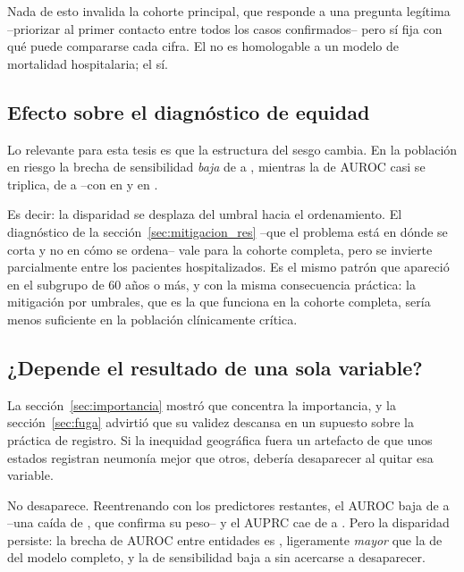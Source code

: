 Nada de esto invalida la cohorte principal, que responde a una pregunta legítima
--priorizar al primer contacto entre todos los casos confirmados-- pero sí fija
con qué puede compararse cada cifra. El \aurocGlobal{} no es homologable a un
modelo de mortalidad hospitalaria; el \hospAUROC{} sí.

\subsection{Efecto sobre el diagnóstico de equidad}

Lo relevante para esta tesis es que la estructura del sesgo cambia. En la
población en riesgo la brecha de sensibilidad \emph{baja} de \gapTPRentidad{} a
\hospGapTPR, mientras la de AUROC casi se triplica, de \gapAUROCentidad{} a
\hospGapAUROC{} --con \hospPeor{} en \hospPeorAUROC{} y \hospMejor{} en
\hospMejorAUROC.

Es decir: la disparidad se desplaza del umbral hacia el ordenamiento. El
diagnóstico de la sección~\ref{sec:mitigacion_res} --que el problema está en
dónde se corta y no en cómo se ordena-- vale para la cohorte completa, pero se
invierte parcialmente entre los pacientes hospitalizados. Es el mismo patrón que
apareció en el subgrupo de 60 años o más, y con la misma consecuencia práctica:
la mitigación por umbrales, que es la que funciona en la cohorte completa, sería
menos suficiente en la población clínicamente crítica.

\subsection{¿Depende el resultado de una sola variable?}

La sección~\ref{sec:importancia} mostró que \texttt{\impPrimeraVar} concentra la
importancia, y la sección~\ref{sec:fuga} advirtió que su validez descansa en un
supuesto sobre la práctica de registro. Si la inequidad geográfica fuera un
artefacto de que unos estados registran neumonía mejor que otros, debería
desaparecer al quitar esa variable.

No desaparece. Reentrenando con los \sinNeuNpred{} predictores restantes, el
AUROC baja de \aurocGlobal{} a \sinNeuAUROC{} --una caída de \sinNeuCaida, que
confirma su peso-- y el AUPRC cae de \auprcGlobal{} a \sinNeuAUPRC. Pero la
disparidad persiste: la brecha de AUROC entre entidades es \sinNeuGapAUROC,
ligeramente \emph{mayor} que la de \gapAUROCentidad{} del modelo completo, y la
de sensibilidad baja a \sinNeuGapTPR{} sin acercarse a desaparecer.

